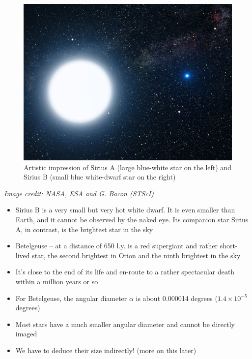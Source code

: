 \documentclass[
  letterpaper,
  DIV=11,
  numbers=noendperiod]{scrartcl}
\providecommand{\tightlist}{%
  \setlength{\itemsep}{0pt}\setlength{\parskip}{0pt}}\usepackage{longtable,booktabs,array}
\begin{document}
\begin{figure}

{\centering \includegraphics{img/siriusAB.jpeg}

}

\caption{Artistic impression of Sirius A (large blue-white star on the
left) and Sirius B (small blue white-dwarf star on the right)}

\end{figure}

\emph{Image credit: NASA, ESA and G. Bacon (STScI)}

\begin{itemize}
\tightlist
\item
  Sirius B is a very small but very hot white dwarf. It is even smaller
  than Earth, and it cannot be observed by the naked eye. Its companion
  star Sirius A, in contrast, is the brightest star in the sky
\item
  Betelgeuse -- at a distance of 650 l.y. is a red supergiant and rather
  short-lived star, the second brightest in Orion and the ninth
  brightest in the sky
\item
  It's close to the end of its life and en-route to a rather spectacular
  death within a million years or so
\item
  For Betelgeuse, the angular diameter \(\alpha\) is about 0.000014
  degrees (\(1.4\times 10^{-5}\) degrees)
\item
  Most stars have a much smaller angular diameter and cannot be directly
  imaged
\item
  We have to deduce their size indirectly! (more on this later)
\end{itemize}
\end{document}
